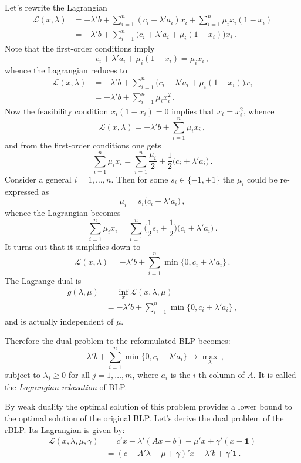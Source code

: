 \documentclass[a4paper]{article}
\newcommand{\Lcal}{\mathcal{L}}
\newcommand{\one}{\mathbf{1}}
\begin{document}
Let's rewrite the Lagrangian
\begin{align*}
\Lcal( x, \lambda )
	&= - \lambda'b + \sum_{i=1}^n ( c_i + \lambda' a_i ) x_i + \sum_{i=1}^n \mu_i x_i (1 - x_i)\\
	&= - \lambda'b + \sum_{i=1}^n \bigl( c_i + \lambda' a_i + \mu_i( 1 - x_i ) \bigr) x_i \,.
\end{align*}
Note that the first-order conditions imply
\[ c_i + \lambda' a_i + \mu_i ( 1 - x_i ) = \mu_i x_i\,, \]
whence the Lagrangian reduces to
\begin{align*}
\Lcal( x, \lambda )
	&= - \lambda'b + \sum_{i=1}^n \bigl( c_i + \lambda' a_i + \mu_i( 1 - x_i ) \bigr) x_i \\
	&= - \lambda'b + \sum_{i=1}^n \mu_i x_i^2 \,.
\end{align*}
Now the feasibility condition $x_i(1-x_i) = 0$ implies that $x_i = x_i^2$, whence
\[
\Lcal( x, \lambda ) = - \lambda'b + \sum_{i=1}^n \mu_i x_i \,,
\]
and from the first-order conditions one gets
\[  
\sum_{i=1}^n \mu_i x_i
= \sum_{i=1}^n \frac{\mu_i}{2} + \frac{1}{2} \bigl( c_i + \lambda' a_i \bigr) \,.
\]
Consider a general $i=1,\ldots,n$. Then for some $s_i\in\{-1,+1\}$ the $\mu_i$ could
be re-expressed as 
\[ \mu_i = s_i \bigl(c_i + \lambda'a_i\bigr)\,, \]
whence the Lagrangian becomes
\[
\sum_{i=1}^n \mu_i x_i
= \sum_{i=1}^n \biggl(\frac{1}{2} s_i + \frac{1}{2}\biggr) \bigl( c_i + \lambda' a_i \bigr) \,.
\]
It turns out that it simplifies down to
\[
\Lcal( x, \lambda ) = - \lambda'b + \sum_{i=1}^n \min \bigl\{0, c_i + \lambda' a_i \bigr\} \,.
\]
The Lagrange dual is
\begin{align*}
	g(\lambda,\mu)
	&= \inf_x \Lcal(x,\lambda,\mu)\\
	&= - \lambda'b + \sum_{i=1}^n \min \bigl\{0, c_i + \lambda' a_i \bigr\}\,,
\end{align*}
and is actually independent of $\mu$.

Therefore the dual problem to the reformulated BLP becomes:
\[ - \lambda'b + \sum_{i=1}^n \min \bigl\{0, c_i + \lambda' a_i \bigr\} \to \max_{\lambda}\,, \]
subject to $\lambda_j \geq 0$ for all $j=1,\ldots,m$, where $a_i$ is the $i$-th
column of $A$. It is called the \emph{Lagrangian relaxation} of BLP.

By weak duality the optimal solution of this problem provides a lower bound to the
optimal solution of the original BLP. Let's derive the dual problem of the rBLP.
Its Lagrangian is given by:
\begin{align*}
	\Lcal( x, \lambda, \mu, \gamma )
	&= c'x - \lambda'(Ax-b) - \mu'x + \gamma'(x-\one) \\
	&= ( c - A'\lambda - \mu + \gamma )' x - \lambda'b + \gamma'\one \,.
\end{align*}
\end{document}
